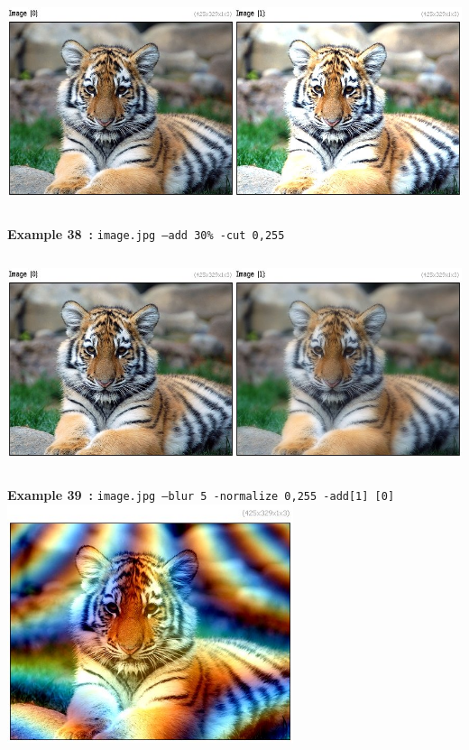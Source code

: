 \documentclass[a4paper,11pt,twoside]{book}
\begin{document}
\begin{center}\includegraphics[keepaspectratio=true,height=7cm,width=\textwidth]{img/gmic_def38.jpg}\\
{\footnotesize \textbf{Example 38~:} \texttt{image.jpg --add 30\% -cut 0,255}}
\\\includegraphics[keepaspectratio=true,height=7cm,width=\textwidth]{img/gmic_def39.jpg}\\
{\footnotesize \textbf{Example 39~:} \texttt{image.jpg --blur 5 -normalize 0,255 -add[1] [0]}}
\\\includegraphics[keepaspectratio=true,height=7cm,width=\textwidth]{img/gmic_def40.jpg}\\

\end{center}
\end{document}
